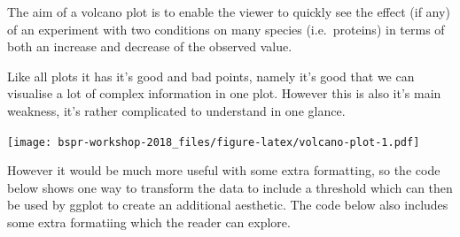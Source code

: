 \documentclass[12pt,]{book}
\newenvironment{Shaded}{\begin{snugshade}}{\end{snugshade}}
\newcommand{\KeywordTok}[1]{\textcolor[rgb]{0.13,0.29,0.53}{\textbf{#1}}}
\newcommand{\StringTok}[1]{\textcolor[rgb]{0.31,0.60,0.02}{#1}}
\newcommand{\OperatorTok}[1]{\textcolor[rgb]{0.81,0.36,0.00}{\textbf{#1}}}
\newcommand{\NormalTok}[1]{#1}
\theoremstyle{definition}
\theoremstyle{definition}
\theoremstyle{definition}
\theoremstyle{remark}
\begin{document}
The aim of a volcano plot is to enable the viewer to quickly see the
effect (if any) of an experiment with two conditions on many species
(i.e.~proteins) in terms of both an increase and decrease of the
observed value.

Like all plots it has it's good and bad points, namely it's good that we
can visualise a lot of complex information in one plot. However this is
also it's main weakness, it's rather complicated to understand in one
glance.

\begin{Shaded}
\end{Shaded}

\texttt{[image: bspr-workshop-2018\_files/figure-latex/volcano-plot-1.pdf]}

However it would be much more useful with some extra formatting, so the
code below shows one way to transform the data to include a threshold
which can then be used by ggplot to create an additional aesthetic. The
code below also includes some extra formatiing which the reader can
explore.
\end{document}
